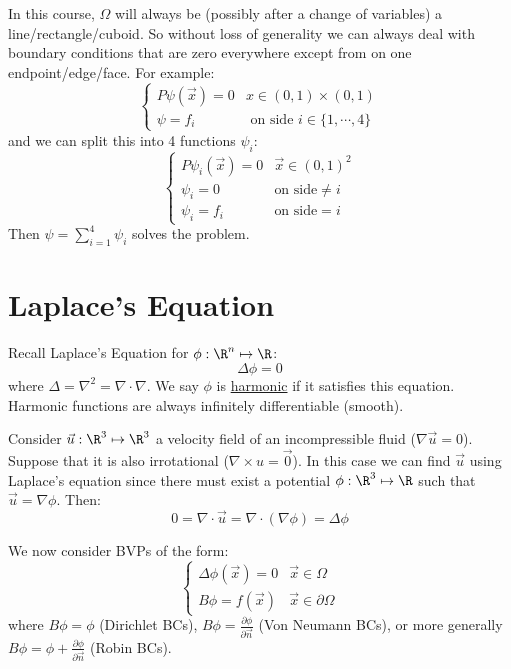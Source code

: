 \documentclass[../Main.tex]{subfiles}
\begin{document}
In this course, $\Omega$ will always be (possibly after a change of variables) a line/rectangle/cuboid. So without loss of generality we can always deal with boundary conditions that are zero everywhere except from on one endpoint/edge/face. For example:
\begin{equation}
    \begin{cases}
        P\psi(\vec{x}) = 0 & x \in (0, 1) \times (0, 1) \\
        \psi = f_i & \text{ on side } i \in \{1, \cdots, 4\}
    \end{cases}
    \label{eqneqnBVPSquare}
\end{equation}
and we can split this into 4 functions $\psi_i$:
\begin{equation*}
    \begin{cases}
        P\psi_i(\vec{x}) = 0 & \vec{x} \in (0, 1)^2 \\
        \psi_i = 0 & \text{on side} \neq i \\
        \psi_i = f_i & \text{on side} = i
    \end{cases}
\end{equation*}
Then $\psi = \sum_{i=1}^4 \psi_i$ solves the problem.
\section{Laplace's Equation}
Recall Laplace's Equation for $\phi : \R^n \mapsto \R$:
\begin{equation}
    \Delta \phi = 0
    \label{eqnLaplace}
\end{equation}
where $\Delta = \nabla^2 = \nabla \cdot \nabla$. We say $\phi$ is \underline{harmonic} if it satisfies this equation. Harmonic functions are always infinitely differentiable (smooth).
\begin{example}
    Consider $\vec{u} : \R^3 \mapsto \R^3$ a velocity field of an incompressible fluid ($\nabla \vec{u} = 0$). Suppose that it is also irrotational ($\nabla \times u = \vec{0}$). In this case we can find $\vec{u}$ using Laplace's equation since there must exist a potential $\phi : \R^3 \mapsto \R$ such that $\vec{u} = \nabla \phi$. Then:
    \begin{equation*}
        0 = \nabla \cdot \vec{u} = \nabla \cdot (\nabla \phi) = \Delta \phi
    \end{equation*}
\end{example}
We now consider BVPs of the form:
\begin{equation*}
    \begin{cases}
        \Delta \phi(\vec{x}) = 0 & \vec{x} \in \Omega \\
        B\phi = f(\vec{x}) & \vec{x} \in \partial \Omega
    \end{cases}
\end{equation*}
where $B\phi = \phi$ (Dirichlet BCs), $B\phi = \frac{\partial \phi}{\partial \vec{n}}$ (Von Neumann BCs), or more generally $B\phi = \phi + \frac{\partial \phi}{\partial \vec{n}}$ (Robin BCs).
\end{document}
